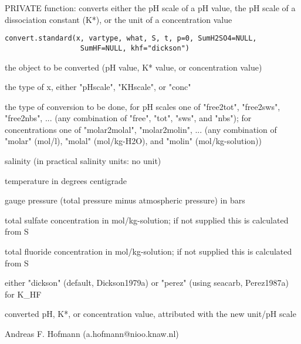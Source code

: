\documentclass{article}
\begin{document}
\begin{Description}\relax
PRIVATE function: converts either the pH scale of a pH value, the pH scale of a dissociation constant (K*), or the unit of a concentration value
\end{Description}
\begin{Usage}
\begin{verbatim}convert.standard(x, vartype, what, S, t, p=0, SumH2SO4=NULL,
                  SumHF=NULL, khf="dickson")\end{verbatim}
\end{Usage}
\begin{Arguments}
\begin{ldescription}
\item[\code{x }] the object to be converted (pH value, K* value, or concentration value)
\item[\code{vartype }] the type of x, either "pHscale", "KHscale", or "conc"
\item[\code{what }] the type of conversion to be done, for pH scales one of "free2tot", "free2sws", "free2nbs", ... (any combination of "free", "tot", "sws", and "nbs"); for concentrations one of "molar2molal", "molar2molin", ... (any combination of "molar" (mol/l), "molal" (mol/kg-H2O), and "molin" (mol/kg-solution))
\item[\code{S }] salinity (in practical salinity units: no unit)
\item[\code{t }] temperature in degrees centigrade
\item[\code{p }] gauge pressure (total pressure minus atmospheric pressure) in bars
\item[\code{SumH2SO4 }] total sulfate concentration in mol/kg-solution; if not supplied this is calculated from S
\item[\code{SumHF }] total fluoride concentration in mol/kg-solution; if not supplied this is calculated from S
\item[\code{khf}] either "dickson" (default, Dickson1979a) or "perez" (using seacarb, Perez1987a) for K\_HF
\end{ldescription}
\end{Arguments}
\begin{Value}
converted pH, K*, or concentration value, attributed with the new unit/pH scale
\end{Value}
\begin{Author}\relax
Andreas F. Hofmann (a.hofmann@nioo.knaw.nl)
\end{Author}
\end{document}
